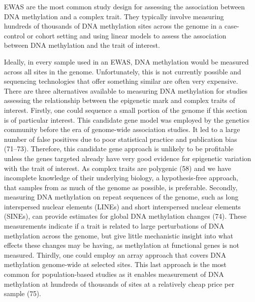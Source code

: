 \documentclass[11pt,oneside]{bristolthesis}
\begin{document}
EWAS are the most common study design for assessing the association between DNA methylation and a complex trait. They typically involve measuring hundreds of thousands of DNA methylation sites across the genome in a case-control or cohort setting and using linear models to assess the association between DNA methylation and the trait of interest.

Ideally, in every sample used in an EWAS, DNA methylation would be measured across all sites in the genome. Unfortunately, this is not currently possible and sequencing technologies that offer something similar are often very expensive. There are three alternatives available to measuring DNA methylation for studies assessing the relationship between the epigenetic mark and complex traits of interest. Firstly, one could sequence a small portion of the genome if this section is of particular interest. This candidate gene model was employed by the genetics community before the era of genome-wide association studies. It led to a large number of false positives due to poor statistical practice and publication bias (71--73). Therefore, this candidate gene approach is unlikely to be profitable unless the genes targeted already have very good evidence for epigenetic variation with the trait of interest. As complex traits are polygenic (58) and we have incomplete knowledge of their underlying biology, a hypothesis-free approach, that samples from as much of the genome as possible, is preferable. Secondly, measuring DNA methylation on repeat sequences of the genome, such as long interspersed nuclear elements (LINEs) and short interspersed nuclear elements (SINEs), can provide estimates for global DNA methylation changes (74). These measurements indicate if a trait is related to large perturbations of DNA methylation across the genome, but give little mechanistic insight into what effects these changes may be having, as methylation at functional genes is not measured. Thirdly, one could employ an array approach that covers DNA methylation genome-wide at selected sites. This last approach is the most common for population-based studies as it enables measurement of DNA methylation at hundreds of thousands of sites at a relatively cheap price per sample (75).
\end{document}
